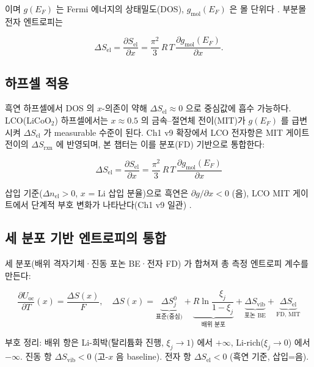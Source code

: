 \documentclass[11pt,a4paper]{article}
\newcommand{\rxn}{\mathrm{rxn}}
\newcommand{\oc}{\mathrm{oc}}
\newcommand{\vib}{\mathrm{vib}}
\newcommand{\elec}{\mathrm{el}}
\begin{document}
이며 $g(E_F)$ 는 Fermi 에너지의 상태밀도(DOS), $g_\mathrm{mol}(E_F)$ 은 몰 단위다 \cite{ashcroft_mermin}.
부분몰 전자 엔트로피는

\begin{equation}
  \Delta S_\elec = \frac{\partial S_\elec}{\partial x}
  = \frac{\pi^2}{3}\,R\,T\,\frac{\partial g_\mathrm{mol}(E_F)}{\partial x}.
  \label{eq:dSel}
\end{equation}

\subsection{하프셀 적용}

흑연 하프셀에서 DOS 의 $x$-의존이 약해 $\Delta S_\elec \approx 0$ 으로 중심값에 흡수 가능하다.
LCO(LiCoO$_2$) 하프셀에서는 $x \approx 0.5$ 의 금속--절연체 전이(MIT)가 $g(E_F)$ 를 급변시켜
$\Delta S_\elec$ 가 measurable 수준이 된다. Ch1 v9 확장에서 LCO 전자항은 MIT 게이트 전이의
$\Delta S_{\rxn}$ 에 반영되며, 본 챕터는 이를 분포(FD) 기반으로 통합한다:

\[
\Delta S_\elec = \frac{\partial S_\elec}{\partial x}
= \frac{\pi^2}{3}\,R\,T\,\frac{\partial g_\mathrm{mol}(E_F)}{\partial x}
\]

삽입 기준($\Delta n_\elec > 0$, $x$ = Li 삽입 분율)으로 흑연은 $\partial g/\partial x < 0$ (음),
LCO MIT 게이트에서 단계적 부호 변화가 나타난다(Ch1 v9 일관) \cite{msmr_partI}.

\subsection{세 분포 기반 엔트로피의 통합}

세 분포(배위 격자기체·진동 포논 BE·전자 FD) 가 합쳐져 총 측정 엔트로피 계수를 만든다:

\begin{equation}
  \boxed{\;
    \frac{\partial U_\oc}{\partial T}(x)
    = \frac{\Delta S(x)}{F}, \quad
    \Delta S(x) = \underbrace{\Delta S^0_j}_{\text{표준(중심)}}
    + \underbrace{R\ln\frac{\xi_j}{1-\xi_j}}_{\text{배위 분포}}
    + \underbrace{\Delta S_\vib}_{\text{포논 BE}}
    + \underbrace{\Delta S_\elec}_{\text{FD, MIT}}
  \;}
  \label{eq:DS_total}
\end{equation}

부호 정리: 배위 항은 Li-희박(탈리튬화 진행, $\xi_j \to 1$) 에서 $+\infty$,
Li-rich($\xi_j \to 0$) 에서 $-\infty$. 진동 항 $\Delta S_\vib < 0$ (고-$x$ 음 baseline).
전자 항 $\Delta S_\elec < 0$ (흑연 기준, 삽입=음).
\end{document}
